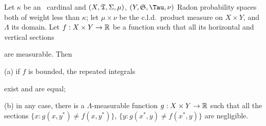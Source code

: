 
 Let
$\kappa$ be an \am\ cardinal and
$(X,\frak T,\Sigma,\penalty-100\mu)$,
$(Y,\frak S,\Tau,\nu)$  Radon probability spaces both of
weight less than $\kappa$;  let $\mu\times\nu$ be the c.l.d.\ product
measure on $X\times Y$, and $\Lambda$ its domain.
Let $f:X\times Y\to\Bbb R$ be a function
such that all its horizontal and vertical sections


\noindent are measurable.    Then

(a) if $f$ is bounded, the repeated integrals


\noindent exist and are equal;

(b) in any case, there is a $\Lambda$-measurable function
$g:X\times Y\to\Bbb R$ such that all the
sections $\{x:g(x,y^*)\ne f(x,y^*)\}$, $\{y:g(x^*,y)\ne f(x^*,y)\}$ are
negligible.

